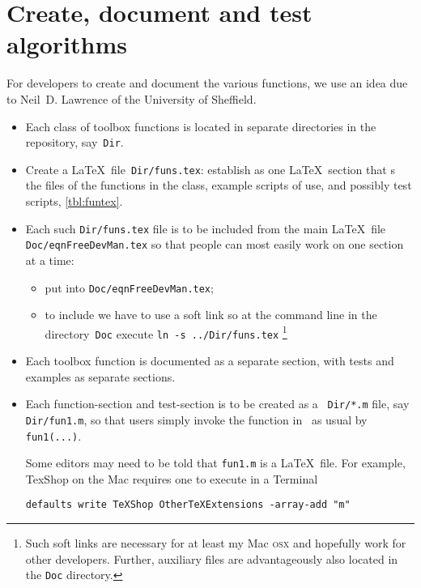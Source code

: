 \chapter{Create, document and test algorithms}
\label{sec:contribute}
\secttoc
\def\LaTeX{LaTeX}%

For developers to create and document the various functions, we use an idea due to Neil~D. Lawrence of the University of Sheffield.

\begin{itemize}
\item Each class of toolbox functions is located in separate directories in the repository, say~\verb|Dir|.

\item Create a \LaTeX\ file~\verb|Dir/funs.tex|: establish as one \LaTeX\ section that \verb||s the  files of the functions in the class, example scripts of use, and possibly test scripts, \autoref{tbl:funtex}.

\item Each such \verb|Dir/funs.tex| file is to be included from the main \LaTeX\ file \verb|Doc/eqnFreeDevMan.tex| so that people can most easily work on one section at a time: 
\begin{itemize}
\item put \verb|| into \verb|Doc/eqnFreeDevMan.tex|;
\item to include we have to use a soft link so at the command line in the directory~\verb|Doc| execute \verb|ln -s ../Dir/funs.tex|
\footnote{Such soft links are necessary for at least my Mac \textsc{osx} and hopefully work for other developers.  Further, auxiliary files are advantageously also located in the \texttt{Doc} directory.}
\end{itemize}

\item Each toolbox function is documented as a separate section, with tests and examples as separate sections.

\item Each function-section and test-section is to be created as a \script\ \verb|Dir/*.m| file, say \verb|Dir/fun1.m|, so that users simply invoke the function in \script\ as usual by \verb|fun1(...)|.

Some editors may need to be told that \verb|fun1.m| is a \LaTeX\ file.  For example, TexShop on the Mac requires one to execute in a Terminal
\begin{verbatim}
defaults write TeXShop OtherTeXExtensions -array-add "m"
\end{verbatim}


\end{itemize}
